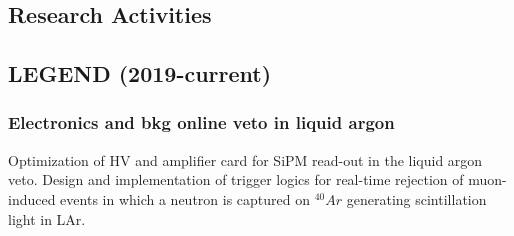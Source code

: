 \documentclass{article}
\begin{document}
\begin{vita}
%

\section*{Research Activities}
\subsection*{LEGEND (2019-current)}
\subsubsection*{Electronics and bkg online veto in liquid argon}
Optimization of HV and amplifier card for SiPM read-out in the liquid argon veto. Design and implementation of trigger logics for real-time rejection of muon-induced events in which a neutron is captured on $^{40}Ar$ generating scintillation light in LAr. 


\end{vita}
\end{document}
